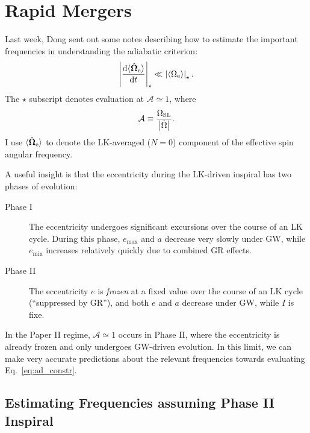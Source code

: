 \documentclass[11pt,
        usenames, %
        dvipsnames %
    ]{article}
\newcommand*{\rd}[2]{\frac{\mathrm{d}#1}{\mathrm{d}#2}}
\newcommand*{\bm}[1]{\boldsymbol{\mathbf{#1}}}
\newcommand*{\uv}[1]{\hat{\bm{#1}}}
\newcommand*{\abs}[1]{\left|#1\right|}
\newcommand*{\ev}[1]{\langle#1\rangle}
\begin{document}
\def\Snospace~{\S{}} %
\renewcommand*{\sectionautorefname}{\Snospace}
\renewcommand*{\appendixautorefname}{\Snospace}
\renewcommand*{\figureautorefname}{Fig.}
\renewcommand*{\equationautorefname}{Eq.}
\renewcommand*{\tableautorefname}{Tab.}

\section{Rapid Mergers}

Last week, Dong sent out some notes describing how to estimate the important
frequencies in understanding the adiabatic criterion:
\begin{equation}
    \abs{\rd{\ev{\uv{\Omega}_{\rm e}}}{t}}_{\star}
        \ll \abs{\ev{\Omega_{\rm e}}}_{\star}.\label{eq:ad_constr}
\end{equation}
The $\star$ subscript denotes evaluation at $\mathcal{A} \simeq 1$, where
\begin{equation}
    \mathcal{A} \equiv \frac{\Omega_{\rm SL}}{\abs{\dot{\Omega}}}.
\end{equation}
I use $\ev{\uv{\Omega}_{\rm e}}$ to denote the LK-averaged ($N = 0$) component
of the effective spin angular frequency.

A useful insight is that the eccentricity during the LK-driven inspiral has two
phases of evolution:
\begin{description}
    \item[Phase I] The eccentricity undergoes significant excursions over the
        course of an LK cycle. During this phase, $e_{\max}$ and $a$ decrease very
        slowly under GW, while $e_{\min}$ increases relatively quickly due to
        combined GR effects.

    \item[Phase II] The eccentricity $e$ is \emph{frozen} at a fixed value over
        the course of an LK cycle (``suppressed by GR''), and both $e$ and $a$
        decrease under GW, while $I$ is fixe.
\end{description}

In the Paper II regime, $\mathcal{A} \simeq 1$ occurs in Phase II, where the
eccentricity is already frozen and only undergoes GW-driven evolution. In this
limit, we can make very accurate predictions about the relevant frequencies
towards evaluating Eq.~\eqref{eq:ad_constr}.

\subsection{Estimating Frequencies assuming Phase II Inspiral}
\end{document}
